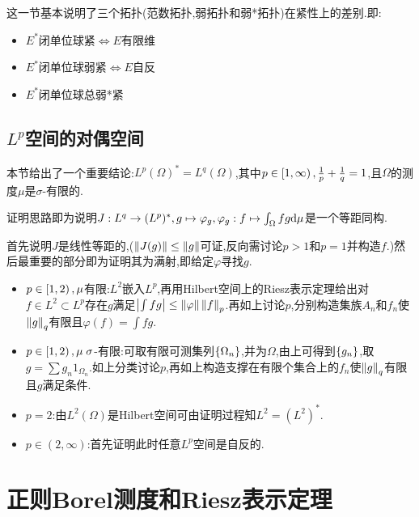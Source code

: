\documentclass{article}
\begin{document}
这一节基本说明了三个拓扑(范数拓扑,弱拓扑和弱*拓扑)在紧性上的差别.即:
\begin{itemize}
    \item $E^*$闭单位球紧$\iff E$有限维
    \item $E^*$闭单位球弱紧$\iff E$自反
    \item $E^*$闭单位球总弱*紧
\end{itemize}

\subsection{$L^p$空间的对偶空间}
本节给出了一个重要结论:$L^p(\Omega)^*=L^q(\Omega)$,其中$p\in \left[1,\infty\right),\frac{1}{p}+\frac{1}{q}=1$,且$\Omega$的测度$\mu$是$\sigma$-有限的.

证明思路即为说明$J:L^q\to (L^p)^*, g\mapsto \varphi_g, \varphi_g:f\mapsto \int_\Omega fg\mathrm{d} \mu$是一个等距同构.

首先说明$J$是线性等距的,($\left\|J(g)\right\|\leq \left\|g\right\|$可证,反向需讨论$p>1$和$p=1$并构造$f$.)然后最重要的部分即为证明其为满射,即给定$\varphi$寻找$g$.
\begin{itemize}
    \item $p\in \left[1,2\right),\mu$有限:$L^2$嵌入$L^p$,再用Hilbert空间上的Riesz表示定理给出对$f\in L^2\subset L^p$存在$g$满足$\left|\int fg\right|\leq \left\|\varphi\right\|\left\|f\right\|_p$.再如上讨论$p$,分别构造集族$A_n$和$f_n$使$\left\|g\right\|_q$有限且$\varphi(f)=\int fg$.
    \item $p\in \left[1,2\right),\mu\; \sigma$-有限:可取有限可测集列$\left\{\Omega_n\right\}$,并为$\Omega$,由上可得到$\left\{g_n\right\}$,取$g=\sum g_n 1_{\Omega_n}$.如上分类讨论$p$,再如上构造支撑在有限个集合上的$f_n$使$\left\|g\right\|_q$有限且$g$满足条件.
    \item $p=2$:由$L^2(\Omega)$是Hilbert空间可由证明过程知$L^2=(L^2)^*$.
    \item $p\in (2,\infty)$:首先证明此时任意$L^p$空间是自反的.\\
\end{itemize}

\section{正则Borel测度和Riesz表示定理}
\end{document}
